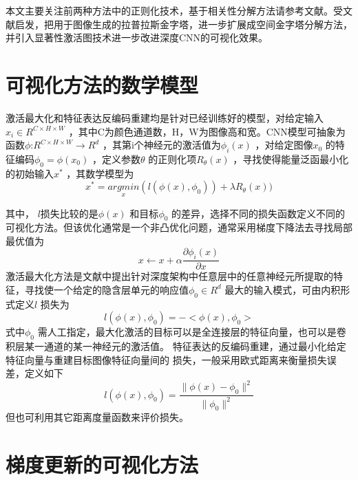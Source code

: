 本文主要关注前两种方法中的正则化技术，基于相关性分解方法请参考文献。受文献\citep{Huang2017c,Denton2015}启发，把用于图像生成的拉普拉斯金字塔，进一步扩展成空间金字塔分解方法，并引入显著性激活图技术进一步改进深度CNN的可视化效果。
\section{可视化方法的数学模型}

激活最大化和特征表达反编码重建均是针对已经训练好的模型，对给定输入$x_{i}\in R^{C\times H\times W}$ ，其中C为颜色通道数，H，W为图像高和宽。CNN模型可抽象为函数$\phi$:$R^{C\times H\times W}\rightarrow R^d$ ，其第i个神经元的激活值为$\phi _{i}(x)$ ，对给定图像$x_{0}$ 的特征编码$\phi _{0}=\phi (x_{0})$ ，定义参数$\theta$ 的正则化项$R_{\theta}(x)$ ，寻找使得能量泛函最小化的初始输入$x^*$ ，其数学模型为
\begin{equation} 
\label{eq:ch04_01}
     x^*=\underset{x}{argmin} (l(\phi (x),\phi _{0})) + \lambda R_\theta(x))
\end{equation}

其中， $l$损失比较的是$\phi (x)$ 和目标$\phi_{0}$ 的差异，选择不同的损失函数定义不同的可视化方法。但该优化通常是一个非凸优化问题，通常采用梯度下降法去寻找局部最优值为
\begin{equation}
\label{eq:ch04_02}
     x \leftarrow x+ \alpha \frac{\partial \phi _{i}(x)}{\partial x}
\end{equation}
激活最大化方法是文献中提出针对深度架构中任意层中的任意神经元所提取的特征，寻找使一个给定的隐含层单元的响应值$\phi _{0}\in R^d$ 最大的输入模式，可由内积形式定义$l$ 损失为
\begin{equation} 
\label{eq:ch04_03}
     l(\phi (x),\phi_{0}) =-<\phi (x),\phi _{0}>
\end{equation}
  式中$\phi_{0}$ 需人工指定，最大化激活的目标可以是全连接层的特征向量，也可以是卷积层某一通道的某一神经元的激活值。
特征表达的反编码重建，通过最小化给定特征向量与重建目标图像特征向量间的 损失，一般采用欧式距离来衡量损失误差，定义如下 
\begin{equation} \label{eq:ch04_04}
     l(\phi (x),\phi _{0}) = \frac{\parallel\phi (x)-\phi _{0} \parallel^2 }{\parallel \phi _{0} \parallel^2 }
\end{equation} 
但也可利用其它距离度量函数来评价损失。

\section{梯度更新的可视化方法}
 
